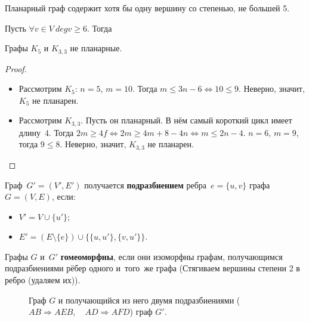 \begin{consequent}
	Планарный граф содержит хотя бы одну вершину со степенью, не большей 5.
\end{consequent}
\begin{proofcontra}
	Пусть $\forall v \in V \ deg v \geqslant 6$.
	Тогда 
\end{proofcontra}

\begin{theorem}
	Графы $K_5$ и $K_{3,3}$ не планарные.
\end{theorem}
\begin{proof}
	\begin{itemize}
		\item Рассмотрим $K_5$: $n = 5$, $m = 10$.
		Тогда $m \leqslant 3n - 6 \Leftrightarrow 10 \leqslant 9$.
		Неверно, значит, $K_5$ не планарен.
		\item Рассмотрим $K_{3,3}$.
		Пусть он планарный.
		В нём самый короткий цикл имеет длину~4.
		Тогда $2m \geqslant 4f \Leftrightarrow 2m \geqslant 4m + 8 - 4n \Leftrightarrow m \leqslant 2n - 4$.
		$n = 6$, $m = 9$, тогда $9 \leqslant 8$.
		Неверно, значит, $K_{3,3}$ не планарен.
	\end{itemize}
\end{proof}

Граф~$G' = (V', E')$ получается \textbf{подразбиением} ребра~$e = \{ u, v \}$ графа~$G = (V, E)$, если:
\begin{itemize}
	\item $V' = V \cup \{ u' \}$;
	\item $E' = (E \setminus \{ e \}) \cup \{ \{ u, u' \}, \{ v, u' \} \}$.
\end{itemize}

Графы $G$ и~$G'$ \textbf{гомеоморфны}, если они изоморфны графам, получающимся подразбиениями рёбер одного и~того~же графа (Стягиваем вершины степени 2 в ребро (удаляем их)).

\begin{figure}[h!]
	\begin{center}
	\end{center}
	\caption{Граф $G$ и получающийся из него двумя подразбиениями ($AB \Rightarrow AEB, \quad AD \Rightarrow AFD$) граф $G'$.}
	\label{pgraph}
\end{figure}

